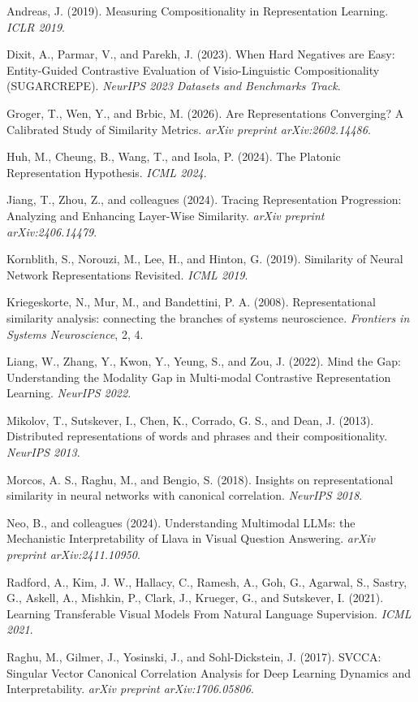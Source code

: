 \documentclass[10pt]{article}
\begin{document}
Andreas, J. (2019). Measuring Compositionality in Representation
Learning. \emph{ICLR 2019}.

Dixit, A., Parmar, V., and Parekh, J. (2023). When Hard Negatives are
Easy: Entity-Guided Contrastive Evaluation of Visio-Linguistic
Compositionality (SUGARCREPE). \emph{NeurIPS 2023 Datasets and
Benchmarks Track}.

Groger, T., Wen, Y., and Brbic, M. (2026). Are Representations
Converging? A Calibrated Study of Similarity Metrics. \emph{arXiv
preprint arXiv:2602.14486}.

Huh, M., Cheung, B., Wang, T., and Isola, P. (2024). The Platonic
Representation Hypothesis. \emph{ICML 2024}.

Jiang, T., Zhou, Z., and colleagues (2024). Tracing Representation
Progression: Analyzing and Enhancing Layer-Wise Similarity. \emph{arXiv
preprint arXiv:2406.14479}.

Kornblith, S., Norouzi, M., Lee, H., and Hinton, G. (2019). Similarity
of Neural Network Representations Revisited. \emph{ICML 2019}.

Kriegeskorte, N., Mur, M., and Bandettini, P. A. (2008).
Representational similarity analysis: connecting the branches of systems
neuroscience. \emph{Frontiers in Systems Neuroscience}, 2, 4.

Liang, W., Zhang, Y., Kwon, Y., Yeung, S., and Zou, J. (2022). Mind the
Gap: Understanding the Modality Gap in Multi-modal Contrastive
Representation Learning. \emph{NeurIPS 2022}.

Mikolov, T., Sutskever, I., Chen, K., Corrado, G. S., and Dean, J.
(2013). Distributed representations of words and phrases and their
compositionality. \emph{NeurIPS 2013}.

Morcos, A. S., Raghu, M., and Bengio, S. (2018). Insights on
representational similarity in neural networks with canonical
correlation. \emph{NeurIPS 2018}.

Neo, B., and colleagues (2024). Understanding Multimodal LLMs: the
Mechanistic Interpretability of Llava in Visual Question Answering.
\emph{arXiv preprint arXiv:2411.10950}.

Radford, A., Kim, J. W., Hallacy, C., Ramesh, A., Goh, G., Agarwal, S.,
Sastry, G., Askell, A., Mishkin, P., Clark, J., Krueger, G., and
Sutskever, I. (2021). Learning Transferable Visual Models From Natural
Language Supervision. \emph{ICML 2021}.

Raghu, M., Gilmer, J., Yosinski, J., and Sohl-Dickstein, J. (2017).
SVCCA: Singular Vector Canonical Correlation Analysis for Deep Learning
Dynamics and Interpretability. \emph{arXiv preprint arXiv:1706.05806}.
\end{document}
